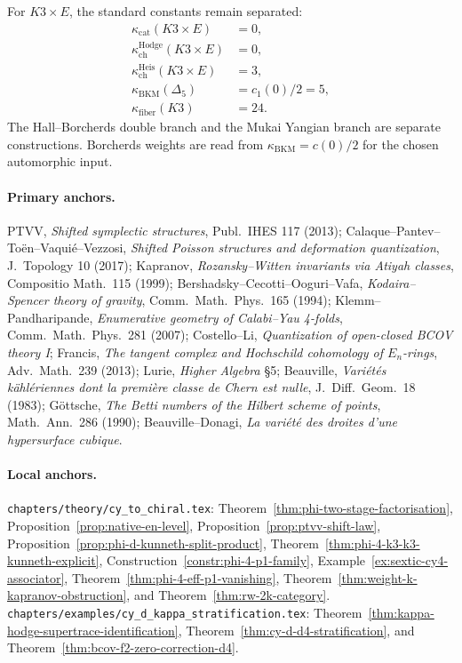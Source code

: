 For \(K3\times E\), the standard constants remain separated:
\[
\begin{aligned}
 \kappa_{\mathrm{cat}}(K3\times E)&=0,\\
 \kappa_{\mathrm{ch}}^{\mathrm{Hodge}}(K3\times E)&=0,\\
 \kappa_{\mathrm{ch}}^{\mathrm{Heis}}(K3\times E)&=3,\\
 \kappa_{\mathrm{BKM}}(\Delta_5)&=c_1(0)/2=5,\\
 \kappa_{\mathrm{fiber}}(K3)&=24.
\end{aligned}
\]
The Hall--Borcherds double branch and the Mukai Yangian branch are
separate constructions. Borcherds weights are read from
\(\kappa_{\mathrm{BKM}}=c(0)/2\) for the chosen automorphic input.

\paragraph{Primary anchors.}
PTVV, \emph{Shifted symplectic structures}, Publ.\ IHES 117 (2013);
Calaque--Pantev--To\"en--Vaqui\'e--Vezzosi, \emph{Shifted Poisson
structures and deformation quantization}, J.\ Topology 10 (2017);
Kapranov, \emph{Rozansky--Witten invariants via Atiyah classes},
Compositio Math.\ 115 (1999); Bershadsky--Cecotti--Ooguri--Vafa,
\emph{Kodaira--Spencer theory of gravity}, Comm.\ Math.\ Phys.\ 165
(1994); Klemm--Pandharipande, \emph{Enumerative geometry of
Calabi--Yau 4-folds}, Comm.\ Math.\ Phys.\ 281 (2007); Costello--Li,
\emph{Quantization of open-closed BCOV theory I}; Francis,
\emph{The tangent complex and Hochschild cohomology of \(E_n\)-rings},
Adv.\ Math.\ 239 (2013); Lurie, \emph{Higher Algebra} \S5; Beauville,
\emph{Vari\'et\'es k\"ahl\'eriennes dont la premi\`ere classe de Chern
est nulle}, J.\ Diff.\ Geom.\ 18 (1983); G\"ottsche,
\emph{The Betti numbers of the Hilbert scheme of points}, Math.\ Ann.\
286 (1990); Beauville--Donagi, \emph{La vari\'et\'e des droites d'une
hypersurface cubique}.

\paragraph{Local anchors.}
\texttt{chapters/theory/cy\_to\_chiral.tex}:
Theorem~\ref{thm:phi-two-stage-factorisation},
Proposition~\ref{prop:native-en-level},
Proposition~\ref{prop:ptvv-shift-law},
Proposition~\ref{prop:phi-d-kunneth-split-product},
Theorem~\ref{thm:phi-4-k3-k3-kunneth-explicit},
Construction~\ref{constr:phi-4-p1-family},
Example~\ref{ex:sextic-cy4-associator},
Theorem~\ref{thm:phi-4-eff-p1-vanishing},
Theorem~\ref{thm:weight-k-kapranov-obstruction}, and
Theorem~\ref{thm:rw-2k-category}.
\texttt{chapters/examples/cy\_d\_kappa\_stratification.tex}:
Theorem~\ref{thm:kappa-hodge-supertrace-identification},
Theorem~\ref{thm:cy-d-d4-stratification}, and
Theorem~\ref{thm:bcov-f2-zero-correction-d4}.
